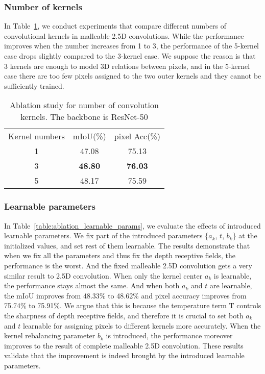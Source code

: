 \documentclass[runningheads]{llncs}
\begin{document}
\subsubsection{Number of kernels}
In Table~\ref{table:ablation_kernel_nums}, we conduct experiments that compare different numbers of convolutional kernels in malleable 2.5D convolutions.
While the performance improves when the number increases from 1 to 3, the performance of the 5-kernel case drops slightly compared to the 3-kernel case.
We suppose the reason is that 3 kernels are enough to model 3D relations between pixels, and in the 5-kernel case there are too few pixels assigned to the two outer kernels and they cannot be sufficiently trained.

\begin{table}[htbp]
  \begin{center}
  \caption{
  Ablation study for number of convolution kernels.
  The backbone is ResNet-50
  }
  \label{table:ablation_kernel_nums}
  \setlength{\tabcolsep}{7pt}
  \begin{tabular}{ccc}
    \hline\noalign{\smallskip}
    Kernel numbers & mIoU(\%) & pixel Acc(\%)\\
    \noalign{\smallskip}
    \hline
    \noalign{\smallskip}
    1 & 47.08 & 75.13 \\
    3 & \textbf{48.80} & \textbf{76.03} \\
    5 & 48.17 & 75.59 \\
    \hline
  \end{tabular}
  \end{center}
\end{table}

\subsubsection{Learnable parameters}
In Table~\ref{table:ablation_learnable_params}, we evaluate the effects of introduced learnable parameters.
We fix part of the introduced parameters \{$a_k$, $t$, $b_k$\} at the initialized values, and set rest of them learnable.
The results demonstrate that when we fix all the parameters and thus fix the depth receptive fields, the performance is the worst.
And the fixed malleable 2.5D convolution gets a very similar result to 2.5D convolution.
When only the kernel center $a_k$ is learnable, the performance stays almost the same.
And when both $a_k$ and $t$ are learnable, the mIoU improves from 48.33\% to 48.62\% and pixel accuracy improves from 75.74\% to 75.91\%.
We argue that this is because the temperature term T controls the sharpness of depth receptive fields, and therefore it is crucial to set both $a_k$ and $t$ learnable for assigning pixels to different kernels more accurately.
When the kernel rebalancing parameter $b_k$ is introduced, the performance moreover improves to the result of complete malleable 2.5D convolution.
These results validate that the improvement is indeed brought by the introduced learnable parameters.
\end{document}
